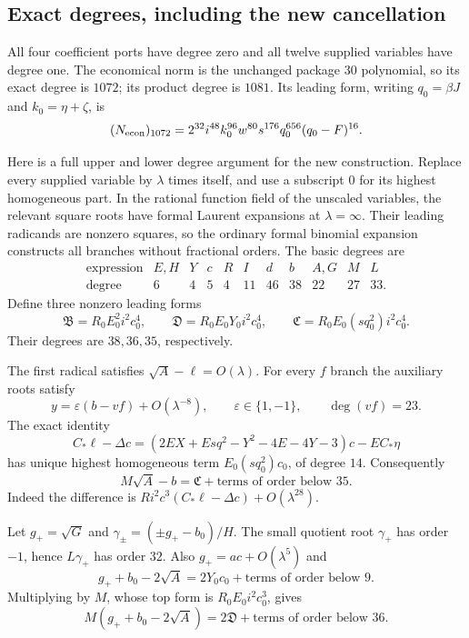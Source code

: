 \subsection{Exact degrees, including the new cancellation}

All four coefficient ports have degree zero and all twelve supplied
variables have degree one.  The economical norm is the unchanged package
30 polynomial, so its exact degree is $1072$; its product degree is $1081$.
Its leading form, writing $q_0=\beta J$ and $k_0=\eta+\zeta$, is
\[
 (N_{\rm econ})_{1072}
 =2^{32}i^{48}k_0^{96}w^{80}s^{176}q_0^{656}(q_0-F)^{16}.
\]

Here is a full upper and lower degree argument for the new construction.
Replace every supplied variable by $\lambda$ times itself, and use a
subscript $0$ for its highest homogeneous part.  In the rational function
field of the unscaled variables, the relevant square roots have formal
Laurent expansions at $\lambda=\infty$.  Their leading radicands are
nonzero squares, so the ordinary formal binomial expansion constructs all
branches without fractional orders.  The basic degrees are
\[
 \begin{array}{c|rrrrrrrrrr}
  \text{expression}&E,H&Y&c&R&I&d&b&A,G&M&L\\ \hline
  \text{degree}&6&4&5&4&11&46&38&22&27&33.
 \end{array}
\]
Define three nonzero leading forms
\[
 \mathfrak B=R_0E_0^2i^2c_0^4,\qquad
 \mathfrak D=R_0E_0Y_0i^2c_0^4,\qquad
 \mathfrak C=R_0E_0(sq_0^2)i^2c_0^4.
\]
Their degrees are $38,36,35$, respectively.

The first radical satisfies $\sqrt A-\ell=O(\lambda)$.
For every $f$ branch the auxiliary roots satisfy
\[
 y=\varepsilon(b-vf)+O(\lambda^{-8}),\qquad
 \varepsilon\in\{1,-1\},\qquad\deg(vf)=23.
\]
The exact identity
\[
 C_*\ell-\Delta c
 =(2EX+Esq^2-Y^2-4E-4Y-3)c-EC_*\eta
\]
has unique highest homogeneous term $E_0(sq_0^2)c_0$, of degree $14$.
Consequently
\begin{equation}
 M\sqrt A-b=\mathfrak C+\text{terms of order below }35.
 \label{eq:new-cancellation-first}
\end{equation}
Indeed the difference is
$Ri^2c^3(C_*\ell-\Delta c)+O(\lambda^{28})$.

Let $g_+=\sqrt G$ and $\gamma_\pm=(\pm g_+-b_0)/H$.
The small quotient root $\gamma_+$ has order $-1$, hence
$L\gamma_+$ has order $32$.
Also $g_+=ac+O(\lambda^5)$ and
\[
 g_++b_0-2\sqrt A
   =2Y_0c_0+\text{terms of order below }9.
\]
Multiplying by $M$, whose top form is $R_0E_0i^2c_0^3$, gives
\begin{equation}
 M(g_++b_0-2\sqrt A)
   =2\mathfrak D+\text{terms of order below }36.
 \label{eq:new-cancellation-second}
\end{equation}

